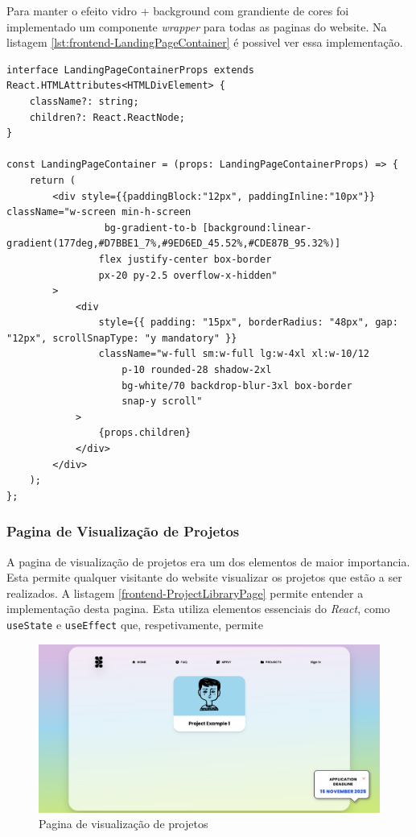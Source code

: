 Para manter o efeito vidro + background com grandiente de cores foi implementado um componente \textit{wrapper} para todas as paginas do website. Na listagem \ref{lst:frontend-LandingPageContainer} é possivel ver essa implementação.

\begin{lstlisting}[caption={Função LandingPageContainer}, label={lst:frontend-LandingPageContainer}]
interface LandingPageContainerProps extends React.HTMLAttributes<HTMLDivElement> {
	className?: string;
    children?: React.ReactNode;
}

const LandingPageContainer = (props: LandingPageContainerProps) => {
    return (
        <div style={{paddingBlock:"12px", paddingInline:"10px"}} className="w-screen min-h-screen
            	 bg-gradient-to-b [background:linear-gradient(177deg,#D7BBE1_7%,#9ED6ED_45.52%,#CDE87B_95.32%)]
            	flex justify-center box-border
				px-20 py-2.5 overflow-x-hidden"
		>
			<div
				style={{ padding: "15px", borderRadius: "48px", gap: "12px", scrollSnapType: "y mandatory" }}
				className="w-full sm:w-full lg:w-4xl xl:w-10/12
            		p-10 rounded-28 shadow-2xl
            		bg-white/70 backdrop-blur-3xl box-border
					snap-y scroll"
			>
				{props.children}
			</div>
		</div>
    );
};
\end{lstlisting}

\subsubsection{Pagina de Visualização de Projetos}

A pagina de visualização de projetos era um dos elementos de maior importancia. Esta permite qualquer visitante do website visualizar os projetos que estão a ser realizados. A listagem \ref{frontend-ProjectLibraryPage} permite entender a implementação desta pagina. Esta utiliza elementos essenciais do \textit{React}, como \lstinline|useState| e \lstinline|useEffect| que, respetivamente, permite 

\begin{figure}[h!tbp]
    \centering
    \includegraphics[width=\linewidth]{capitulos/cap4-implementacao/assets/frontend/blended-project-page.png}
    \caption{Pagina de visualização de projetos}
    \label{fig:frontend-project-page}
\end{figure}

